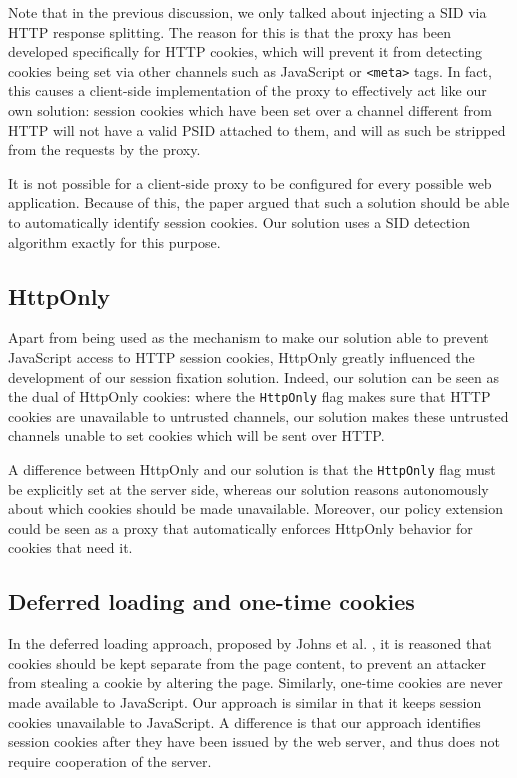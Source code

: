 Note that in the previous discussion, we only talked about injecting a SID via HTTP response splitting. The reason for this is that the proxy has been developed specifically for HTTP cookies, which will prevent it from detecting cookies being set via other channels such as JavaScript or \texttt{<meta>} tags. In fact, this causes a client-side implementation of the proxy to effectively act like our own solution: session cookies which have been set over a channel different from HTTP will not have a valid PSID attached to them, and will as such be stripped from the requests by the proxy.

It is not possible for a client-side proxy to be configured for every possible web application. Because of this, the paper argued that such a solution should be able to automatically identify session cookies. Our solution uses a SID detection algorithm exactly for this purpose.

\subsection{HttpOnly}\label{httponlyremark}

Apart from being used as the mechanism to make our solution able to prevent JavaScript access to HTTP session cookies, HttpOnly greatly influenced the development of our session fixation solution. Indeed, our solution can be seen as the dual of HttpOnly cookies: where the \texttt{HttpOnly} flag makes sure that HTTP cookies are unavailable to untrusted channels, our solution makes these untrusted channels unable to set cookies which will be sent over HTTP.

A difference between HttpOnly and our solution is that the \texttt{HttpOnly} flag must be explicitly set at the server side, whereas our solution reasons autonomously about which cookies should be made unavailable.  Moreover, our policy extension could be seen as a proxy that automatically enforces HttpOnly behavior for cookies that need it.

\subsection{Deferred loading and one-time cookies}

In the deferred loading approach, proposed by Johns et al. \cite{Johns2006}, it is reasoned that cookies should be kept separate from the page content, to prevent an attacker from stealing a cookie by altering the page. Similarly, one-time cookies \cite{Dacosta2011} are never made available to JavaScript. Our approach is similar in that it keeps session cookies unavailable to JavaScript. A difference is that our approach identifies session cookies after they have been issued by the web server, and thus does not require cooperation of the server.

